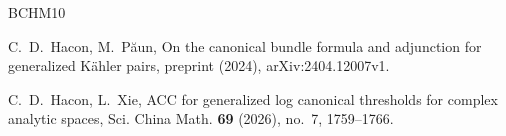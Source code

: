 \documentclass[12pt]{amsart}
\theoremstyle{definition}
\begin{document}
\begin{thebibliography}{BCHM10}








C.~D.~Hacon, M.~P\u{a}un, On the canonical bundle formula and adjunction for generalized K\"{a}hler pairs, preprint (2024), arXiv:2404.12007v1. 

 C.~D.~Hacon, L.~Xie, ACC for generalized log canonical thresholds for complex analytic spaces, Sci. China Math. {\textbf{69}} (2026), no.~7, 1759--1766.









\end{thebibliography}
\end{document}
